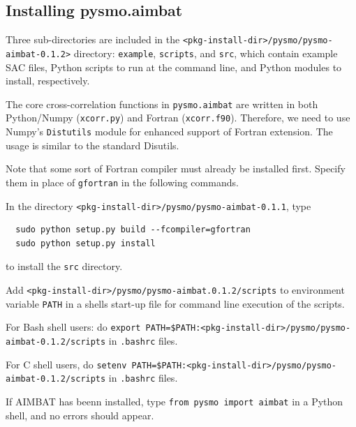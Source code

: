 \documentclass[letterpaper,10pt]{article}
\begin{document}

\subsection{Installing pysmo.aimbat}

Three sub-directories are included in the \verb"<pkg-install-dir>/pysmo/pysmo-aimbat-0.1.2>" directory: \verb"example", \verb"scripts", and \verb"src", which contain example SAC files, Python scripts to run at the command line, and Python modules to install, respectively.

The core cross-correlation functions in \verb"pysmo.aimbat" are written in both Python/Numpy (\verb"xcorr.py") and Fortran (\verb"xcorr.f90"). Therefore, we need to use Numpy's \verb"Distutils" module for enhanced support of Fortran extension. The usage is similar to the standard Disutils. 

Note that some sort of Fortran compiler must already be installed first. Specify them in place of \verb"gfortran" in the following commands.

In the directory \verb"<pkg-install-dir>/pysmo/pysmo-aimbat-0.1.1", type

\begin{verbatim}
  sudo python setup.py build --fcompiler=gfortran
  sudo python setup.py install 
\end{verbatim}

to install the \verb"src" directory. 

Add \verb"<pkg-install-dir>/pysmo/pysmo-aimbat.0.1.2/scripts" to environment variable \verb"PATH" in a shells start-up file for command line execution of the scripts.

For Bash shell users: do \verb"export PATH=$PATH:<pkg-install-dir>/pysmo/pysmo-aimbat-0.1.2/scripts" in \verb".bashrc" files.

For C shell users, do \verb"setenv PATH=$PATH:<pkg-install-dir>/pysmo/pysmo-aimbat-0.1.2/scripts" in \verb".bashrc" files.

If AIMBAT has beenn installed, type \verb"from pysmo import aimbat" in a Python shell, and no errors should appear. 

\end{document}
